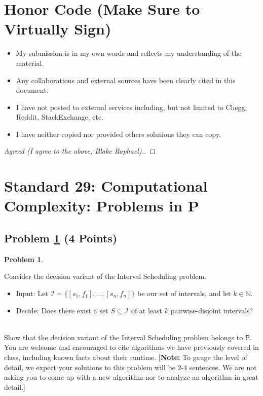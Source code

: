 \documentclass[11pt]{article}
\theoremstyle{definition}
\theoremstyle{definition}
\newtheorem{required}{Problem}
\theoremstyle{definition}
\begin{document}
\section{Honor Code (Make Sure to Virtually Sign)} \label{HonorCode}

\begin{itemize}
\item My submission is in my own words and reflects my understanding of the material.
\item Any collaborations and external sources have been clearly cited in this document.
\item I have not posted to external services including, but not limited to Chegg, Reddit, StackExchange, etc.
\item I have neither copied nor provided others solutions they can copy.
\end{itemize}


\begin{proof}[Agreed (I agree to the above, Blake Raphael).]
\end{proof}
\newpage
\section{Standard 29: Computational Complexity: Problems in \textsf{P}}
\subsection{Problem \ref{NP1} (4 Points)}
\begin{required} \label{NP1}

Consider the decision variant of the \textsf{Interval Scheduling} problem.
\begin{itemize}
\item \textsf{Input:} Let $\mathcal{I} = \{ [s_{1}, f_{1}], \ldots, [s_{n}, f_{n}] \}$ be our set of intervals, and let $k \in \mathbb{N}$.

\item \textsf{Decide:} Does there exist a set $S \subseteq \mathcal{I}$ of at least $k$ pairwise-disjoint intervals?
\end{itemize}


\noindent \\ Show that the decision variant of the \textsf{Interval Scheduling} problem belongs to $\textsf{P}$. You are welcome and encouraged to cite algorithms we have previously covered in class, including known facts about their runtime. [\textbf{Note:} To gauge the level of detail, we expect your solutions to this problem will be 2-4 sentences. We are not asking you to come up with a new algorithm nor to analyze an algorithm in great detail.]
\end{required}
\end{document}
